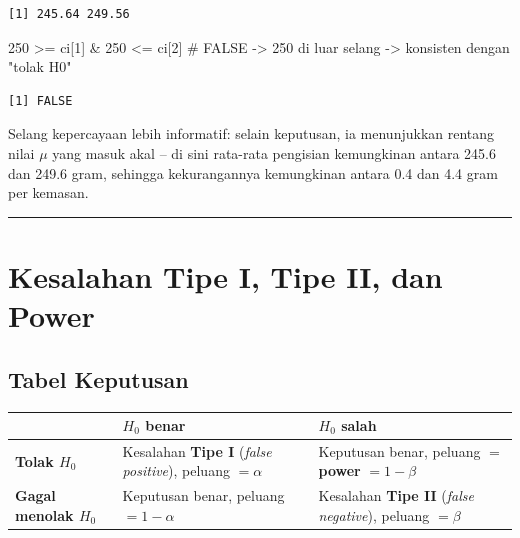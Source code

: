 \documentclass[
  indonesian,
  letterpaper,
]{book}
\newenvironment{Shaded}{\begin{snugshade}}{\end{snugshade}}
\newcommand{\CommentTok}[1]{\textcolor[rgb]{0.37,0.37,0.37}{#1}}
\newcommand{\DecValTok}[1]{\textcolor[rgb]{0.68,0.00,0.00}{#1}}
\newcommand{\NormalTok}[1]{\textcolor[rgb]{0.00,0.23,0.31}{#1}}
\newcommand{\SpecialCharTok}[1]{\textcolor[rgb]{0.37,0.37,0.37}{#1}}
\newcounter{none} %
\begin{document}
\begin{verbatim}
[1] 245.64 249.56
\end{verbatim}

\begin{Shaded}
\begin{Highlighting}[]
\DecValTok{250} \SpecialCharTok{\textgreater{}=}\NormalTok{ ci[}\DecValTok{1}\NormalTok{] }\SpecialCharTok{\&} \DecValTok{250} \SpecialCharTok{\textless{}=}\NormalTok{ ci[}\DecValTok{2}\NormalTok{]   }\CommentTok{\# FALSE {-}\textgreater{} 250 di luar selang {-}\textgreater{} konsisten dengan "tolak H0"}
\end{Highlighting}
\end{Shaded}

\begin{verbatim}
[1] FALSE
\end{verbatim}

Selang kepercayaan lebih informatif: selain keputusan, ia menunjukkan
rentang nilai \(\mu\) yang masuk akal -- di sini rata-rata pengisian
kemungkinan antara 245.6 dan 249.6 gram, sehingga kekurangannya
kemungkinan antara 0.4 dan 4.4 gram per kemasan.

\begin{center}\rule{0.5\linewidth}{0.5pt}\end{center}

\section{Kesalahan Tipe I, Tipe II, dan
Power}\label{kesalahan-tipe-i-tipe-ii-dan-power}

\subsection{Tabel Keputusan}\label{tabel-keputusan}

{\def\LTcaptype{none} %
\begin{longtable}[]{@{}
  >{\raggedright\arraybackslash}p{}
  >{\raggedright\arraybackslash}p{}
  >{\raggedright\arraybackslash}p{}@{}}
\toprule\noalign{}
\begin{minipage}[b]{\linewidth}\raggedright
\end{minipage} & \begin{minipage}[b]{\linewidth}\raggedright
\(H_0\) benar
\end{minipage} & \begin{minipage}[b]{\linewidth}\raggedright
\(H_0\) salah
\end{minipage} \\
\midrule\noalign{}
\endhead
\bottomrule\noalign{}
\endlastfoot
\textbf{Tolak \(H_0\)} & Kesalahan \textbf{Tipe I} (\emph{false
positive}), peluang \(= \alpha\) & Keputusan benar, peluang \(=\)
\textbf{power} \(= 1-\beta\) \\
\textbf{Gagal menolak \(H_0\)} & Keputusan benar, peluang \(= 1-\alpha\)
& Kesalahan \textbf{Tipe II} (\emph{false negative}), peluang
\(= \beta\) \\
\end{longtable}
}
\end{document}
